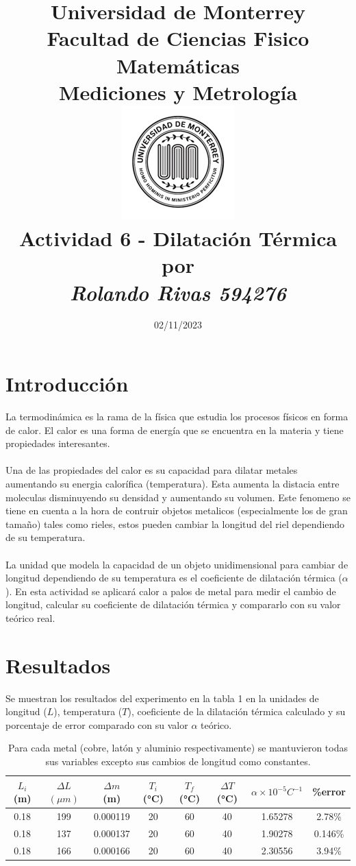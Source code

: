 \documentclass[a4paper,12pt]{article}
\author{}
\date{02/11/2023}
\title{\Large \textbf{Universidad de Monterrey}\\ Facultad de Ciencias Fisico Matemáticas \\ Mediciones y Metrología \\ \includegraphics{imagenes/UdemLogo.png} \\ \vspace{5mm} \LARGE \textbf{Actividad 6 - Dilatación Térmica} \\ \vspace{1cm} \normalsize por \\ \vspace{1cm} \Large \textit{Rolando Rivas 594276}}
\begin{document}
\maketitle
\section*{Introducción}
La termodinámica es la rama de la física que estudia los procesos físicos en forma de calor. El calor es una forma de energía que se encuentra en la materia y tiene propiedades interesantes. 
\\\\
Una de las propiedades del calor es su capacidad para dilatar metales aumentando su energia calorífica (temperatura). Esta aumenta la distacia entre moleculas disminuyendo su densidad y aumentando su volumen. Este fenomeno se tiene en cuenta a la hora de contruir objetos metalicos (especialmente los de gran tamaño) tales como rieles, estos pueden cambiar la longitud del riel dependiendo de su temperatura. 
\\\\
La unidad que modela la capacidad de un objeto unidimensional para cambiar de longitud dependiendo de su temperatura es el coeficiente de dilatación térmica ($\alpha$). En esta actividad se aplicará calor a palos de metal para medir el cambio de longitud, calcular su coeficiente de dilatación térmica y compararlo con su valor teórico real. 
\\
\section*{Resultados}
Se muestran los resultados del experimento en la tabla 1 en la unidades de longitud ($L$), temperatura ($T$), coeficiente de la dilatación térmica calculado y su porcentaje de error comparado con su valor $\alpha$ teórico. 

\begin{table}[h]
\centering
\begin{tabular}{||c c c c c c c c||}
\hline
$L_{i}$ (m) & $\Delta L$ $(\mu m)$ & $\Delta m$ (m) & $T_{i}$ (°C) & $T_{f}$ (°C) & $\Delta T$ (°C) & $\alpha \times 10^{-5} C^{-1}$  & \%error \\ [0.5ex]
\hline\hline
0.18 & 199 & 0.000119 & 20 & 60 & 40 & 1.65278 & 2.78\%  \\ 
0.18 & 137 & 0.000137 & 20 & 60 & 40 & 1.90278 & 0.146\% \\
0.18 & 166 & 0.000166 & 20 & 60 & 40 & 2.30556 & 3.94\%  \\
\hline
\end{tabular}
\caption{Para cada metal (cobre, latón y aluminio respectivamente) se mantuvieron todas sus variables excepto sus cambios de longitud como constantes.}
\end{table}
\end{document}
